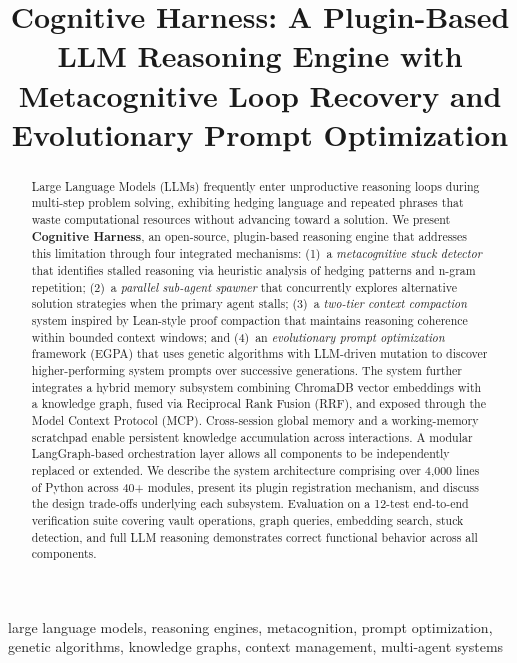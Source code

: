 \documentclass[conference]{IEEEtran}
\begin{document}
\title{Cognitive Harness: A Plugin-Based LLM Reasoning Engine with Metacognitive Loop Recovery and Evolutionary Prompt Optimization}

\author{
}

\maketitle

\begin{abstract}
Large Language Models (LLMs) frequently enter unproductive reasoning loops during multi-step problem solving, exhibiting hedging language and repeated phrases that waste computational resources without advancing toward a solution. We present \textbf{Cognitive Harness}, an open-source, plugin-based reasoning engine that addresses this limitation through four integrated mechanisms: (1)~a \emph{metacognitive stuck detector} that identifies stalled reasoning via heuristic analysis of hedging patterns and n-gram repetition; (2)~a \emph{parallel sub-agent spawner} that concurrently explores alternative solution strategies when the primary agent stalls; (3)~a \emph{two-tier context compaction} system inspired by Lean-style proof compaction that maintains reasoning coherence within bounded context windows; and (4)~an \emph{evolutionary prompt optimization} framework (EGPA) that uses genetic algorithms with LLM-driven mutation to discover higher-performing system prompts over successive generations. The system further integrates a hybrid memory subsystem combining ChromaDB vector embeddings with a knowledge graph, fused via Reciprocal Rank Fusion (RRF), and exposed through the Model Context Protocol (MCP). Cross-session global memory and a working-memory scratchpad enable persistent knowledge accumulation across interactions. A modular LangGraph-based orchestration layer allows all components to be independently replaced or extended. We describe the system architecture comprising over 4,000 lines of Python across 40+ modules, present its plugin registration mechanism, and discuss the design trade-offs underlying each subsystem. Evaluation on a 12-test end-to-end verification suite covering vault operations, graph queries, embedding search, stuck detection, and full LLM reasoning demonstrates correct functional behavior across all components.
\end{abstract}

\begin{IEEEkeywords}
large language models, reasoning engines, metacognition, prompt optimization, genetic algorithms, knowledge graphs, context management, multi-agent systems
\end{IEEEkeywords}
\end{document}
